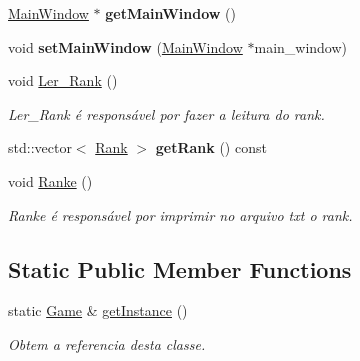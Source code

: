 \begin{DoxyCompactItemize}
\item 
\hypertarget{class_game_a741d01349d27c8916d6e9975d9c5b470}{}\hyperlink{class_main_window}{Main\+Window} $\ast$ {\bfseries get\+Main\+Window} ()\label{class_game_a741d01349d27c8916d6e9975d9c5b470}

\item 
\hypertarget{class_game_ae9c76f7611a410ac2c92df34cff50a41}{}void {\bfseries set\+Main\+Window} (\hyperlink{class_main_window}{Main\+Window} $\ast$main\+\_\+window)\label{class_game_ae9c76f7611a410ac2c92df34cff50a41}

\item 
void \hyperlink{class_game_a178202f60562a3e55ad721dfb03aff09}{Ler\+\_\+\+Rank} ()
\begin{DoxyCompactList}\small\item\em Ler\+\_\+\+Rank é responsável por fazer a leitura do rank. \end{DoxyCompactList}\item 
\hypertarget{class_game_af8abce48250bf82bc64e30ecc4f2074b}{}std\+::vector$<$ \hyperlink{struct_game_1_1_rank}{Rank} $>$ {\bfseries get\+Rank} () const \label{class_game_af8abce48250bf82bc64e30ecc4f2074b}

\item 
void \hyperlink{class_game_a6b565543a6eaf08a583a9944e8e48d5e}{Ranke} ()
\begin{DoxyCompactList}\small\item\em Ranke é responsável por imprimir no arquivo txt o rank. \end{DoxyCompactList}\end{DoxyCompactItemize}
\subsection*{Static Public Member Functions}
\begin{DoxyCompactItemize}
\item 
static \hyperlink{class_game}{Game} \& \hyperlink{class_game_ab5b377b52d78849aed162538121a20a0}{get\+Instance} ()
\begin{DoxyCompactList}\small\item\em Obtem a referencia desta classe. \end{DoxyCompactList}\end{DoxyCompactItemize}
